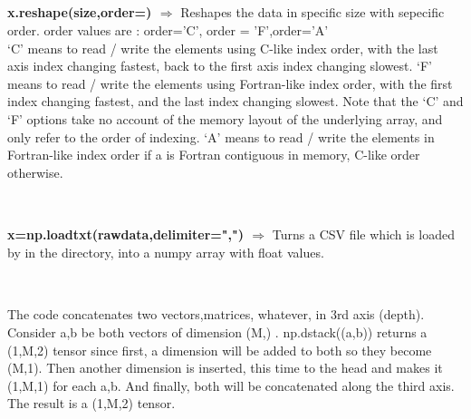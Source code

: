 \documentclass[a4paper,18pt]{article}
\begin{document}

\subsection{\colorbox {matgreen}{\color{white}{\large Reshape}}}
\textbf{x.reshape(size,order=) $\Rightarrow$} Reshapes the data in specific size with sepecific order. order values are : order='C', order = 'F',order='A'\\

 ‘C’ means to read / write the elements using C-like index order, with the last axis index changing fastest, back to the first axis index changing slowest. ‘F’ means to read / write the elements using Fortran-like index order, with the first index changing fastest, and the last index changing slowest. Note that the ‘C’ and ‘F’ options take no account of the memory layout of the underlying array, and only refer to the order of indexing. ‘A’ means to read / write the elements in Fortran-like index order if a is Fortran contiguous in memory, C-like order otherwise.\\\\

\subsection{\colorbox {matgreen}{\color{white}{\large np.loadtxt(rawdata,delimiter=",")}}}
\textbf{x=np.loadtxt(rawdata,delimiter=",") $\Rightarrow$} Turns a CSV file which is loaded by {\colorbox{matgreen}{\color{white}{open(filename,'rt')}}} in the directory, into a numpy array with float values.\\\\


\subsection{\colorbox {matgreen}{\color{white}{\large np.dstack(TUP)}}}
The code concatenates two vectors,matrices, whatever, in 3rd axis (depth). Consider a,b be both vectors of dimension (M,) . np.dstack((a,b)) returns a (1,M,2) tensor since first, a dimension will be added to both so they become (M,1). Then another dimension is inserted, this time to the head and makes it (1,M,1) for each a,b. And finally, both will be concatenated along the third axis. The result is a (1,M,2) tensor.\\
\end{document}
